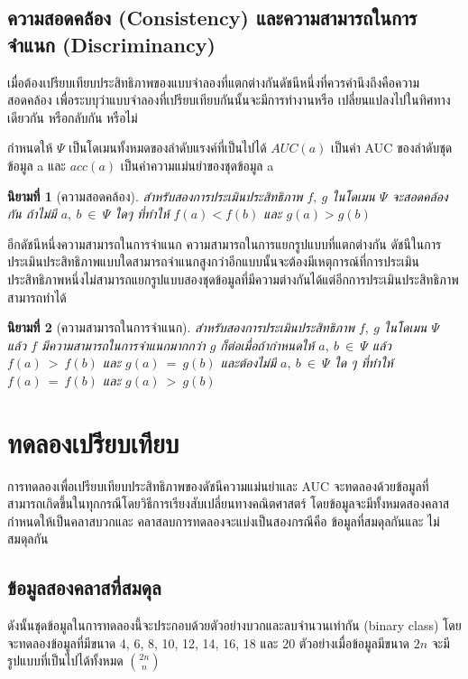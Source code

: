 \documentclass[twoside, twocolumn, 12pt]{article}
\newtheorem{mydef}{นิยามที่}
\begin{document}
\subsection{ความสอดคล้อง (Consistency) และความสามารถในการจำแนก (Discriminancy)}
\quad เมื่อต้องเปรียบเทียบประสิทธิภาพของแบบจำลองที่แตกต่างกันดัชนีหนึ่งที่ควรคำนึงถึงคือความสอดคล้อง เพื่อระบบุว่าแบบจำลองที่เปรียบเทียบกันนั้นจะมีการทำงานหรือ เปลี่ยนแปลงไปในทิศทางเดียวกัน หรือกลับกัน หรือไม่

กำหนดให้ $\Psi$ เป็นโดเมนทั้งหมดของลำดับแรงค์ที่เป็นไปได้ $AUC(a)$ เป็นค่า AUC ของลำดับชุดข้อมูล a และ  $acc(a)$ เป็นค่าความแม่นยำของชุดข้อมูล a 
\begin{mydef}[ความสอดคล้อง]\label{def:ความสอดคล้อง}
สำหรับสองการประเมินประสิทธิภาพ $f,\:g$ ในโดเมน $\Psi$ จะสอดคล้องกัน ถ้าไม่มี $a,\:b\:\in\:\Psi$ ใดๆ ที่ทำให้ $f(a) < f(b)$ และ $g(a) > g(b)$
\end{mydef}

อีกดัชนีหนึ่งความสามารถในการจำแนก ความสามารถในการแยกรูปแบบที่แตกต่างกัน ดัชนีในการประเมินประสิทธิภาพแบบใดสามารถจำแนกสูงกว่าอีกแบบนั้นจะต้องมีเหตุการณ์ที่การประเมินประสิทธิภาพหนึ่งไม่สามารถแยกรูปแบบสองชุดข้อมูลที่มีความต่างกันได้แต่อีกการประเมินประสิทธิภาพสามารถทำได้

\begin{mydef}[ความสามารถในการจำแนก]\label{def:ความสามารถในการจำแนก}
สำหรับสองการประเมินประสิทธิภาพ $f,\:g$ ในโดเมน $\Psi$ แล้ว $f$ มีความสามารถในการจำแนกมากกว่า $g$ ก็ต่อเมื่อถ้ากำหนดให้ $a,\:b\:\in\:\Psi$ แล้ว $f(a)\:>\:f(b)$ และ $g(a)\:=\:g(b)$ และต้องไม่มี $a,\:b\:\in\:\Psi$ ใด ๆ ที่ทำให้ $f(a)\:=\:f(b)$ และ $g(a)\:>\:g(b)$
\end{mydef}

\section{ทดลองเปรียบเทียบ}

\quad การทดลองเพื่อเปรียบเทียบประสิทธิภาพของดัชนีความแม่นยำและ AUC จะทดลองด้วยข้อมูลที่สามารถเกิดขึ้นในทุกกรณีโดยวิธีการเรียงสับเปลี่ยนทางคณิตศาสตร์ โดยข้อมูลจะมีทั้งหมดสองคลาสกำหนดให้เป็นคลาสบวกและ คลาสลบการทดลองจะแบ่งเป็นสองกรณีคือ ข้อมูลที่สมดุลกันและ ไม่สมดุลกัน

\subsection{ข้อมูลสองคลาสที่สมดุล}
\quad ดังนั้นชุดข้อมูลในการทดลองนี้จะประกอบด้วยตัวอย่างบวกและลบจำนวนเท่ากัน (binary class) โดยจะทดลองข้อมูลที่มีขนาด 4, 6, 8, 10, 12, 14, 16, 18 และ 20 ตัวอย่างเมื่อข้อมูลมีขนาด $2n$ จะมีรูปแบบที่เป็นไปได้ทั้งหมด ${{2n}\choose{n}}$ 
\end{document}

